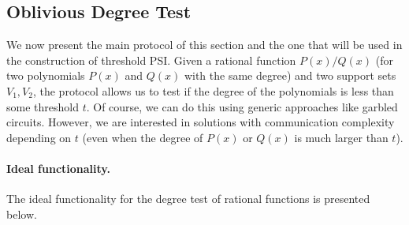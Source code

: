 \begin{center}
\end{center}



\subsection{Oblivious Degree Test}
\label{subsec:degtest}
We now present the main protocol of this section and the one that will be used in the construction of threshold PSI. Given a rational function $P(x)/Q(x)$ (for two polynomials $P(x)$ and $Q(x)$ with the same degree) and two support sets $V_1,V_2$, the protocol allows us to test if the degree of the polynomials is less than some threshold $t$. Of course, we can do this using generic approaches like garbled circuits. However, we are interested in solutions with communication complexity depending on $t$ (even when the degree of $P(x)$ or $Q(x)$ is much larger than $t$). 

\paragraph{Ideal functionality.} The ideal functionality for the degree test of rational functions is presented below.

